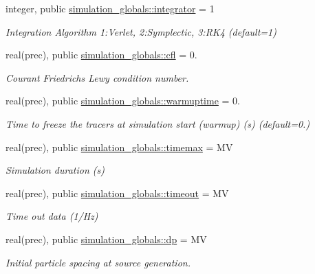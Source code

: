 \begin{DoxyCompactItemize}
\item 
integer, public \mbox{\hyperlink{namespacesimulation__globals_a56eb8ca9469c8bc172fa289bee344a85}{simulation\+\_\+globals\+::integrator}} = 1
\begin{DoxyCompactList}\small\item\em Integration Algorithm 1\+:Verlet, 2\+:Symplectic, 3\+:R\+K4 (default=1) \end{DoxyCompactList}\item 
real(prec), public \mbox{\hyperlink{namespacesimulation__globals_ab022711051f6c5905fa22f5f715d0efb}{simulation\+\_\+globals\+::cfl}} = 0.
\begin{DoxyCompactList}\small\item\em Courant Friedrichs Lewy condition number. \end{DoxyCompactList}\item 
real(prec), public \mbox{\hyperlink{namespacesimulation__globals_a1be81c2d5db4400cd1a9a1c4e25728d2}{simulation\+\_\+globals\+::warmuptime}} = 0.
\begin{DoxyCompactList}\small\item\em Time to freeze the tracers at simulation start (warmup) (s) (default=0.) \end{DoxyCompactList}\item 
real(prec), public \mbox{\hyperlink{namespacesimulation__globals_aca61ad35c1c57ca41152ce3707d412e3}{simulation\+\_\+globals\+::timemax}} = MV
\begin{DoxyCompactList}\small\item\em Simulation duration (s) \end{DoxyCompactList}\item 
real(prec), public \mbox{\hyperlink{namespacesimulation__globals_ac867a68f020b7352cd68bbe996cfdf24}{simulation\+\_\+globals\+::timeout}} = MV
\begin{DoxyCompactList}\small\item\em Time out data (1/\+Hz) \end{DoxyCompactList}\item 
real(prec), public \mbox{\hyperlink{namespacesimulation__globals_ad8772390891d3fa9d701db0fc341a1ab}{simulation\+\_\+globals\+::dp}} = MV
\begin{DoxyCompactList}\small\item\em Initial particle spacing at source generation. \end{DoxyCompactList}\item 

\end{DoxyCompactItemize}

